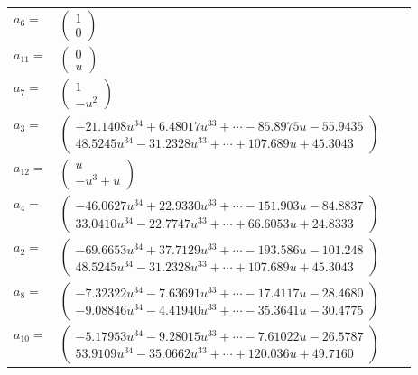 \documentclass[1p]{elsarticle_modified}
\theoremstyle{definition}
\begin{document}
\begin{tabular}{m{7pt} m{180pt} m{7pt} m{180pt} }
\flushright $a_{6}=$&$\begin{pmatrix}1\\0\end{pmatrix}$ \\
\flushright $a_{11}=$&$\begin{pmatrix}0\\u\end{pmatrix}$ \\
\flushright $a_{7}=$&$\begin{pmatrix}1\\- u^2\end{pmatrix}$ \\
\flushright $a_{3}=$&$\begin{pmatrix}-21.1408 u^{34}+6.48017 u^{33}+\cdots-85.8975 u-55.9435\\48.5245 u^{34}-31.2328 u^{33}+\cdots+107.689 u+45.3043\end{pmatrix}$ \\
\flushright $a_{12}=$&$\begin{pmatrix}u\\- u^3+u\end{pmatrix}$ \\
\flushright $a_{4}=$&$\begin{pmatrix}-46.0627 u^{34}+22.9330 u^{33}+\cdots-151.903 u-84.8837\\33.0410 u^{34}-22.7747 u^{33}+\cdots+66.6053 u+24.8333\end{pmatrix}$ \\
\flushright $a_{2}=$&$\begin{pmatrix}-69.6653 u^{34}+37.7129 u^{33}+\cdots-193.586 u-101.248\\48.5245 u^{34}-31.2328 u^{33}+\cdots+107.689 u+45.3043\end{pmatrix}$ \\
\flushright $a_{8}=$&$\begin{pmatrix}-7.32322 u^{34}-7.63691 u^{33}+\cdots-17.4117 u-28.4680\\-9.08846 u^{34}-4.41940 u^{33}+\cdots-35.3641 u-30.4775\end{pmatrix}$ \\
\flushright $a_{10}=$&$\begin{pmatrix}-5.17953 u^{34}-9.28015 u^{33}+\cdots-7.61022 u-26.5787\\53.9109 u^{34}-35.0662 u^{33}+\cdots+120.036 u+49.7160\end{pmatrix}$ \\

\end{tabular}
\end{document}
